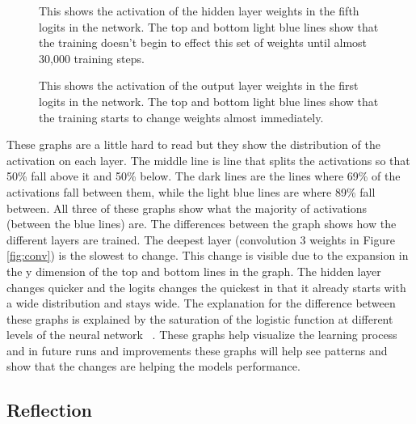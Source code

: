\documentclass[12pt,twocolumn,letterpaper]{article}
\begin{document}
\begin{figure}[t]
\begin{center}
\end{center}
   \caption{This shows the activation of the hidden layer weights in the fifth logits in 
   the network. The top and bottom light blue lines show that the training doesn't 
   begin to effect this set of weights until almost 30,000 training steps.}
\label{fig:hidden}
\end{figure}

\begin{figure}[t]
\begin{center}
\end{center}
   \caption{This shows the activation of the output layer weights in the first logits in 
   the network. The top and bottom light blue lines show that the training starts to change 
   weights almost immediately.}
\label{fig:logits}
\end{figure}

These graphs are a little hard to read but they show the distribution of the 
activation on each layer. The middle line is line that splits the activations so 
that 50\% fall above it and 50\% below. The dark lines are the lines where 69\% 
of the activations fall between them, while the light blue lines are where 89\% 
fall between. All three of these graphs show what the majority of activations 
(between the blue lines) are. The differences between the graph shows how the 
different layers are trained. The deepest layer (convolution 3 weights in Figure
\ref{fig:conv}) is the slowest to change. This change is visible due to the expansion in the 
y dimension of the top and bottom lines in the graph. The hidden layer changes 
quicker and the logits changes the quickest in that it already starts with a 
wide distribution and stays wide. The explanation for the difference between 
these graphs is explained by the saturation of the logistic function at different 
levels of the neural network ~\cite{xavier}. These graphs help visualize the learning process and 
in future runs and improvements these graphs will help see patterns and show that
the changes are helping the models performance.

\subsection{Reflection}
\end{document}
